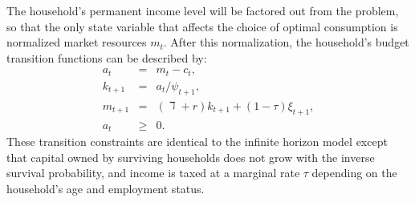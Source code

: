 \documentclass[11pt,a4paper,pdftex]{article}\usepackage[pdftex]{graphicx}\usepackage{epstopdf} \usepackage[pdftex]{hyperref}
\newcommand{\aRat}{\ensuremath{a}}
\newcommand{\cRat}{\ensuremath{c}}
\newcommand{\kRat}{\ensuremath{k}}
\newcommand{\mRat}{\ensuremath{m}}
\newcommand{\pshk}{\psi} %
\newcommand{\rProd}{\ensuremath{\mathit{r}}}
\newcommand{\tshk}{\xi} %
\begin{document}
The household's permanent income level will be factored out from the problem, so that the only state variable that affects the choice of optimal consumption is normalized market resources $\mRat_t$.  After this normalization, the household's budget transition functions can be described by:
\begin{eqnarray}
\label{LifeCycleConstraint1}
\aRat_t &=& \mRat_t - \cRat_t,\\
\label{LifeCycleConstraint2}
\kRat_{t+1} &=& \aRat_t/\pshk_{t+1},\\
\label{LifeCycleConstraint3}
\mRat_{t+1} &=& (\daleth +\rProd) \kRat_{t+1} + (1 - \tau)\tshk_{t+1},\\
\label{LifeCycleConstraint4}
\aRat_t &\geq& 0.
\end{eqnarray}
These transition constraints are identical to the infinite horizon model except that capital owned by surviving households does not grow with the inverse survival probability, and income is taxed at a marginal rate $\tau$ depending on the household's age and employment status.
\end{document}
